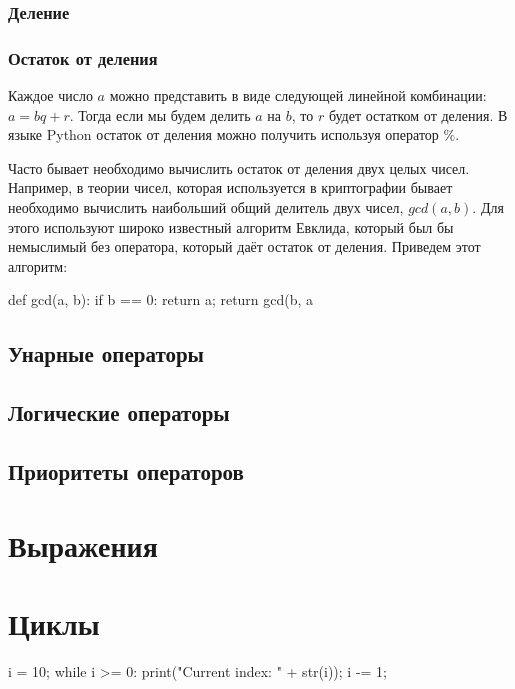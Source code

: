\subsubsection{Деление}

\subsubsection{Остаток от деления}

Каждое число $a$ можно представить в виде следующей линейной комбинации: $a=bq+r$.
Тогда если мы будем делить $a$ на $b$, то $r$ будет остатком от деления. В языке Python
остаток от деления можно получить используя оператор $\%$.

Часто бывает необходимо вычислить остаток от деления двух целых чисел. Например,
в теории чисел, которая используется в криптографии бывает необходимо вычислить 
наибольший общий делитель двух чисел, $gcd(a, b)$. Для этого используют широко известный 
алгоритм Евклида, который был бы немыслимый без оператора, который даёт
остаток от деления. Приведем этот алгоритм:

\begin{python}
def gcd(a, b):
	if b == 0:
		return a;
	return gcd(b, a %
\end{python}

\subsection{Унарные операторы}

\subsection{Логические операторы}

\subsection{Приоритеты операторов}

\section{Выражения}

\section{Циклы}

\begin{python}
i = 10;
while i >= 0:
  print("Current index: " + str(i));
  i -= 1;
\end{python}

